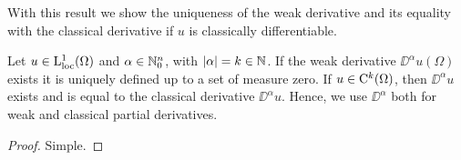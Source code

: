 With this result we show the uniqueness of the weak derivative and its equality with the classical derivative if $u$ is classically differentiable.

\begin{lem}
  Let $u \in \mathrm{L}_{\operatorname{loc}}^1(\Omega)$ and $\alpha \in \mathbb{N}_0^n$, with $|\alpha| = k \in \mathbb{N}$. 
  If the weak derivative $\DD^\alpha u(\Omega)$ exists it is uniquely defined up to a set of measure zero.
  If $u \in \mathrm{C}^k(\Omega)$, then $\DD^\alpha u$ exists and is equal to the classical derivative $\DD^\alpha u$. 
  Hence, we use $\DD^\alpha$ both for weak and classical partial derivatives.
\end{lem}

\begin{proof}
  Simple.
\end{proof}
